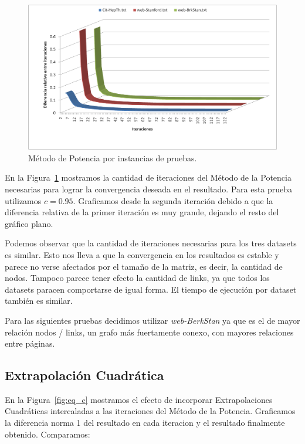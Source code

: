 \begin{figure}[!htbp]
  \begin{center}
    \includegraphics[scale=0.35]{img/datasets.png}
    \caption{\label{fig:datasets} Método de Potencia por instancias de pruebas.}
  \end{center}
\end{figure}

En la Figura~\ref{fig:datasets} mostramos la cantidad de iteraciones del Método
de la Potencia necesarias para lograr la convergencia deseada en el resultado.
Para esta prueba utilizamos $c=0.95$. Graficamos desde la segunda iteración
debido a que la diferencia relativa de la primer iteración es muy grande,
dejando el resto del gráfico plano.

Podemos observar que la cantidad de iteraciones necesarias para los tres
datasets es similar. Esto nos lleva a que la convergencia en los resultados es
estable y parece no verse afectados por el tamaño de la matriz, es decir, la
cantidad de nodos. Tampoco parece tener efecto la cantidad de links, ya que
todos los datasets paracen comportarse de igual forma. El tiempo de ejecución
por dataset también es similar.

Para las siguientes pruebas decidimos utilizar \emph{web-BerkStan} ya que es el
de mayor relación nodos / links, un grafo más fuertamente conexo, con mayores
relaciones entre páginas.

\subsection{Extrapolación Cuadrática}

En la Figura~\ref{fig:eq_c} mostramos el efecto de incorporar Extrapolaciones
Cuadráticas intercaladas a las iteraciones del Método de la Potencia.
Graficamos la diferencia norma 1 del resultado en cada iteracion y el resultado
finalmente obtenido. Comparamos:

